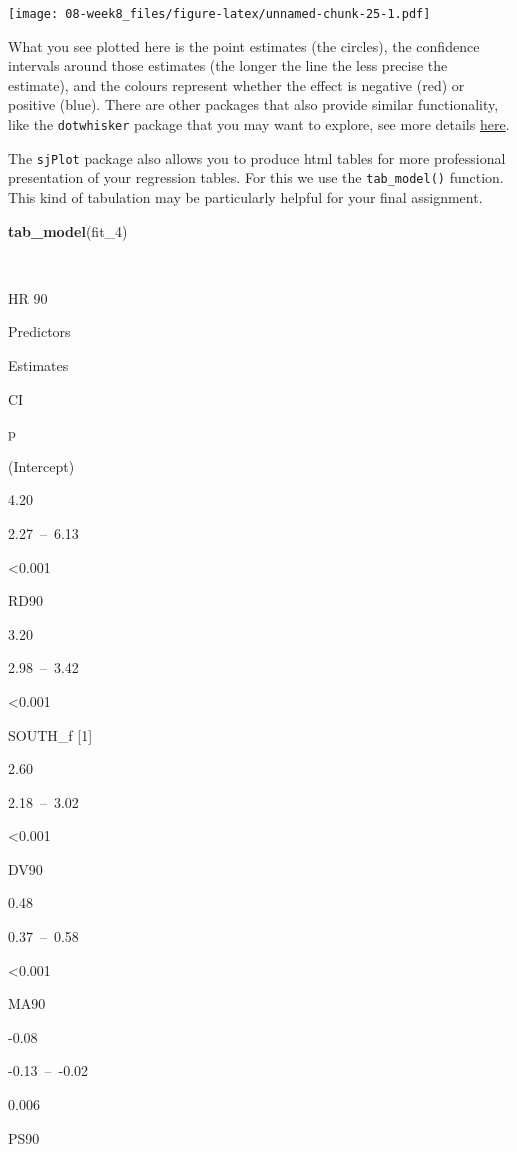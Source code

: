 \documentclass[]{book}
\newenvironment{Shaded}{\begin{snugshade}}{\end{snugshade}}
\newcommand{\DecValTok}[1]{\textcolor[rgb]{0.00,0.00,0.81}{#1}}
\newcommand{\KeywordTok}[1]{\textcolor[rgb]{0.13,0.29,0.53}{\textbf{#1}}}
\newcommand{\NormalTok}[1]{#1}
\begin{document}
\texttt{[image: 08-week8\_files/figure-latex/unnamed-chunk-25-1.pdf]}

What you see plotted here is the point estimates (the circles), the confidence intervals around those estimates (the longer the line the less precise the estimate), and the colours represent whether the effect is negative (red) or positive (blue). There are other packages that also provide similar functionality, like the \texttt{dotwhisker} package that you may want to explore, see more details \href{https://cran.r-project.org/web/packages/dotwhisker/vignettes/dotwhisker-vignette.html}{here}.

The \texttt{sjPlot} package also allows you to produce html tables for more professional presentation of your regression tables. For this we use the \texttt{tab\_model()} function. This kind of tabulation may be particularly helpful for your final assignment.

\begin{Shaded}
\begin{Highlighting}[]
\KeywordTok{tab_model}\NormalTok{(fit_}\DecValTok{4}\NormalTok{)}
\end{Highlighting}
\end{Shaded}

~

HR 90

Predictors

Estimates

CI

p

(Intercept)

4.20

2.27~--~6.13

\textless{}0.001

RD90

3.20

2.98~--~3.42

\textless{}0.001

SOUTH\_f {[}1{]}

2.60

2.18~--~3.02

\textless{}0.001

DV90

0.48

0.37~--~0.58

\textless{}0.001

MA90

-0.08

-0.13~--~-0.02

0.006

PS90
\end{document}
